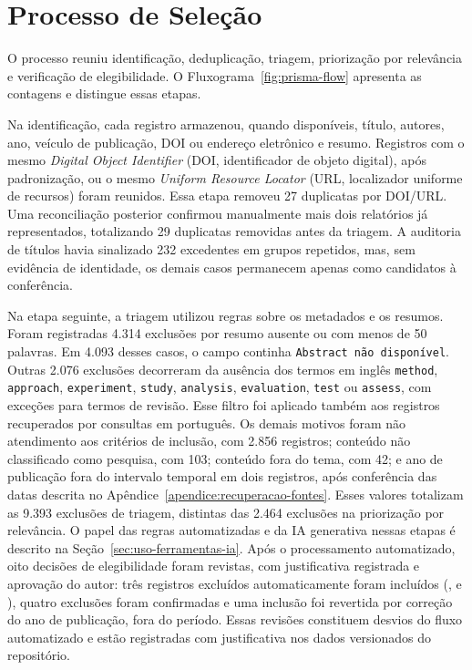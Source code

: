 \section{Processo de Seleção}
\label{sec:processo-selecao}

O processo reuniu identificação, deduplicação, triagem, priorização por relevância e verificação de elegibilidade. O Fluxograma~\ref{fig:prisma-flow} apresenta as contagens e distingue essas etapas.

Na identificação, cada registro armazenou, quando disponíveis, título, autores, ano, veículo de publicação, DOI ou endereço eletrônico e resumo. Registros com o mesmo \textit{Digital Object Identifier} (DOI, identificador de objeto digital), após padronização, ou o mesmo \textit{Uniform Resource Locator} (URL, localizador uniforme de recursos) foram reunidos. Essa etapa removeu 27 duplicatas por DOI/URL. Uma reconciliação posterior confirmou manualmente mais dois relatórios já representados, totalizando 29 duplicatas removidas antes da triagem. A auditoria de títulos havia sinalizado 232 excedentes em grupos repetidos, mas, sem evidência de identidade, os demais casos permanecem apenas como candidatos à conferência.

Na etapa seguinte, a triagem utilizou regras sobre os metadados e os resumos. Foram registradas 4.314 exclusões por resumo ausente ou com menos de 50 palavras. Em 4.093 desses casos, o campo continha \texttt{Abstract não disponível}. Outras 2.076 exclusões decorreram da ausência dos termos em inglês \texttt{method}, \texttt{approach}, \texttt{experiment}, \texttt{study}, \texttt{analysis}, \texttt{evaluation}, \texttt{test} ou \texttt{assess}, com exceções para termos de revisão. Esse filtro foi aplicado também aos registros recuperados por consultas em português. Os demais motivos foram não atendimento aos critérios de inclusão, com 2.856 registros; conteúdo não classificado como pesquisa, com 103; conteúdo fora do tema, com 42; e ano de publicação fora do intervalo temporal em dois registros, após conferência das datas descrita no Apêndice~\ref{apendice:recuperacao-fontes}. Esses valores totalizam as 9.393 exclusões de triagem, distintas das 2.464 exclusões na priorização por relevância. O papel das regras automatizadas e da IA generativa nessas etapas é descrito na Seção~\ref{sec:uso-ferramentas-ia}.
 Após o processamento automatizado, oito decisões de elegibilidade foram revistas, com justificativa registrada e aprovação do autor: três registros excluídos automaticamente foram incluídos (,  e ), quatro exclusões foram confirmadas e uma inclusão foi revertida por correção do ano de publicação, fora do período. Essas revisões constituem desvios do fluxo automatizado e estão registradas com justificativa nos dados versionados do repositório.

